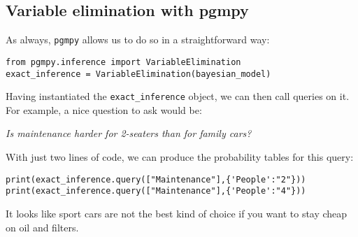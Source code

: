 \subsection{Variable elimination with pgmpy}
As always, \texttt{pgmpy} allows us to do so in a straightforward way:
\begin{verbatim}
from pgmpy.inference import VariableElimination
exact_inference = VariableElimination(bayesian_model)
\end{verbatim}
Having instantiated the \texttt{exact\_inference} object, we can then call queries on it. For example, a nice question to ask would be:
\begin{center}
    \textit{Is maintenance harder for 2-seaters than for family cars?}
\end{center}
With just two lines of code, we can produce the probability tables for this query:
\begin{verbatim}
print(exact_inference.query(["Maintenance"],{'People':"2"}))
print(exact_inference.query(["Maintenance"],{'People':"4"}))
\end{verbatim}
\begin{center}
\begin{figure}[H]
\end{figure}
\end{center}
It looks like sport cars are not the best kind of choice if you want to stay cheap on oil and filters.
